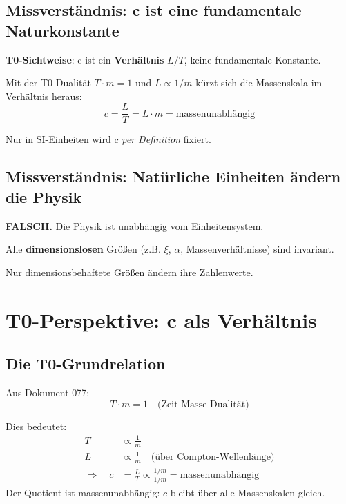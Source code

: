 	\subsection{Missverständnis: c ist eine fundamentale Naturkonstante}
	
	\textbf{T0-Sichtweise}: c ist ein \textbf{Verhältnis} $L/T$, keine fundamentale Konstante.
	
	Mit der T0-Dualität $T \cdot m = 1$ und $L \propto 1/m$ kürzt sich die Massenskala im Verhältnis heraus:
	\begin{equation}
		c = \frac{L}{T} = L \cdot m = \text{massenunabhängig}
	\end{equation}
	
	Nur in SI-Einheiten wird c \emph{per Definition} fixiert.
	
	\subsection{Missverständnis: Natürliche Einheiten ändern die Physik}
	
	\textbf{FALSCH.} Die Physik ist unabhängig vom Einheitensystem.
	
	Alle \textbf{dimensionslosen} Größen (z.B. $\xi$, $\alpha$, Massenverhältnisse) sind invariant.
	
	Nur dimensionsbehaftete Größen ändern ihre Zahlenwerte.
	
	\section{T0-Perspektive: c als Verhältnis}
	
	\subsection{Die T0-Grundrelation}
	
	Aus Dokument 077:
	\begin{equation}
		T \cdot m = 1 \quad \text{(Zeit-Masse-Dualität)}
	\end{equation}
	
	Dies bedeutet:
	\begin{align}
		T &\propto \frac{1}{m} \\
		L &\propto \frac{1}{m} \quad \text{(über Compton-Wellenlänge)} \\
		\Rightarrow \quad c &= \frac{L}{T} \propto \frac{1/m}{1/m} = \text{massenunabhängig}
	\end{align}
	Der Quotient ist massenunabhängig: $c$ bleibt über alle Massenskalen gleich.
	
